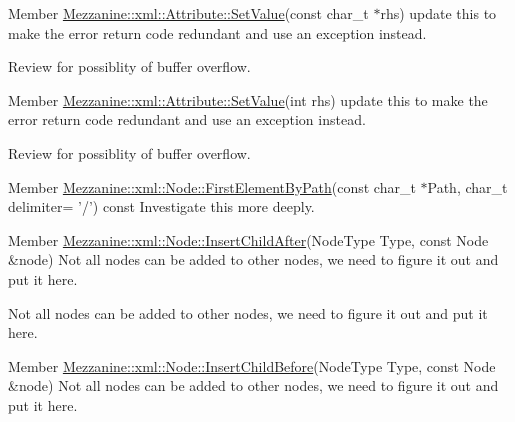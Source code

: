 \label{todo__todo000050}
\hypertarget{todo__todo000050}{}
 
\begin{DoxyDescription}
\item[Member \hyperlink{classMezzanine_1_1xml_1_1Attribute_a850c7d6692ac542ea197952c734e3800}{Mezzanine::xml::Attribute::SetValue}(const char\_\-t $\ast$rhs) ]update this to make the error return code redundant and use an exception instead. 

Review for possiblity of buffer overflow. 
\end{DoxyDescription}

\label{todo__todo000051}
\hypertarget{todo__todo000051}{}
 
\begin{DoxyDescription}
\item[Member \hyperlink{classMezzanine_1_1xml_1_1Attribute_ae17cb2b4aadcf29fc74e6d16fa1ad746}{Mezzanine::xml::Attribute::SetValue}(int rhs) ]update this to make the error return code redundant and use an exception instead. 

Review for possiblity of buffer overflow. 
\end{DoxyDescription}

\label{todo__todo000064}
\hypertarget{todo__todo000064}{}
 
\begin{DoxyDescription}
\item[Member \hyperlink{classMezzanine_1_1xml_1_1Node_a0cc23e97d5ed9b2c1c46fcb442d8b337}{Mezzanine::xml::Node::FirstElementByPath}(const char\_\-t $\ast$Path, char\_\-t delimiter= '/') const  ]Investigate this more deeply. 
\end{DoxyDescription}

\label{todo__todo000062}
\hypertarget{todo__todo000062}{}
 
\begin{DoxyDescription}
\item[Member \hyperlink{classMezzanine_1_1xml_1_1Node_a227829d650b184329245c5abdd0476df}{Mezzanine::xml::Node::InsertChildAfter}(NodeType Type, const Node \&node) ]Not all nodes can be added to other nodes, we need to figure it out and put it here. 

Not all nodes can be added to other nodes, we need to figure it out and put it here. 
\end{DoxyDescription}

\label{todo__todo000057}
\hypertarget{todo__todo000057}{}
 
\begin{DoxyDescription}
\item[Member \hyperlink{classMezzanine_1_1xml_1_1Node_a0f877b7c3d64ede9a73662ed2fff0ef5}{Mezzanine::xml::Node::InsertChildBefore}(NodeType Type, const Node \&node) ]Not all nodes can be added to other nodes, we need to figure it out and put it here. 
\end{DoxyDescription}

